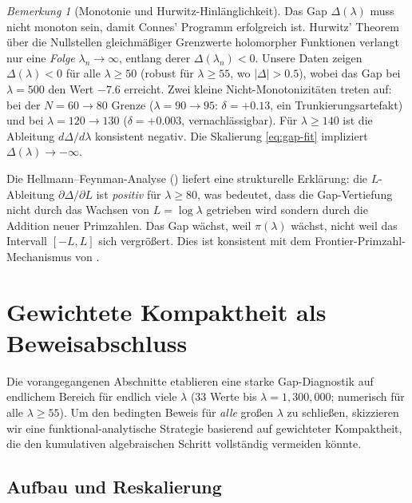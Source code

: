 ﻿\documentclass[12pt,a4paper]{article}
\theoremstyle{definition}
\theoremstyle{remark}
\newtheorem{remark}[theorem]{Bemerkung}
\begin{document}
\begin{remark}[Monotonie und Hurwitz-Hinlänglichkeit]
\label{rem:hurwitz}
Das Gap $\Delta(\lambda)$ muss nicht monoton sein, damit Connes' Programm erfolgreich ist. Hurwitz' Theorem über die Nullstellen gleichmäßiger Grenzwerte holomorpher Funktionen verlangt nur eine \emph{Folge} $\lambda_n \to \infty$, entlang derer $\Delta(\lambda_n) < 0$. Unsere Daten zeigen $\Delta(\lambda) < 0$ für alle $\lambda \geq 50$ (robust für $\lambda \geq 55$, wo $|\Delta| > 0.5$), wobei das Gap bei $\lambda = 500$ den Wert $-7.6$ erreicht. Zwei kleine Nicht-Monotonizitäten treten auf: bei der $N = 60 \to 80$ Grenze ($\lambda = 90 \to 95$: $\delta = +0.13$, ein Trunkierungsartefakt) und bei $\lambda = 120 \to 130$ ($\delta = +0.003$, vernachlässigbar). Für $\lambda \geq 140$ ist die Ableitung $d\Delta/d\lambda$ konsistent negativ. Die Skalierung \eqref{eq:gap-fit} impliziert $\Delta(\lambda) \to -\infty$.

Die Hellmann--Feynman-Analyse () liefert eine strukturelle Erklärung: die $L$-Ableitung $\partial\Delta/\partial L$ ist \emph{positiv} für $\lambda \geq 80$, was bedeutet, dass die Gap-Vertiefung nicht durch das Wachsen von $L = \log\lambda$ getrieben wird sondern durch die Addition neuer Primzahlen. Das Gap wächst, weil $\pi(\lambda)$ wächst, nicht weil das Intervall $[-L, L]$ sich vergrößert. Dies ist konsistent mit dem Frontier-Primzahl-Mechanismus von .
\end{remark}


\section{Gewichtete Kompaktheit als Beweisabschluss}
\label{sec:weighted-compactness}

Die vorangegangenen Abschnitte etablieren eine starke Gap-Diagnostik auf endlichem Bereich für endlich viele $\lambda$ ($33$ Werte bis $\lambda = 1{,}300{,}000$; numerisch für alle $\lambda \geq 55$). Um den bedingten Beweis für \emph{alle} großen $\lambda$ zu schließen, skizzieren wir eine funktional-analytische Strategie basierend auf gewichteter Kompaktheit, die den kumulativen algebraischen Schritt vollständig vermeiden könnte.

\subsection{Aufbau und Reskalierung}
\end{document}
